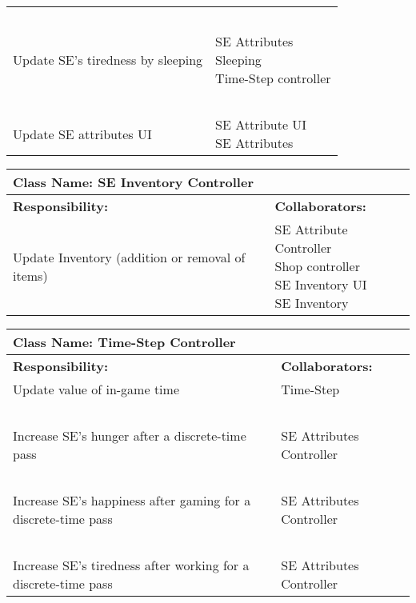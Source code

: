 \documentclass[]{article}
\begin{document}
\begin{table}[H]
\begin{tabular}{|p{5cm}|p{5cm}|}
        ~ & ~\\
        Update SE’s tiredness by sleeping & \makecell[l]{SE Attributes\\Sleeping\\Time-Step controller}\\
        ~ & ~\\
        Update SE attributes UI & \makecell[l]{SE Attribute UI\\SE Attributes}\\
        \hline
    \end{tabular}
\end{table}

\begin{table}[H]
    \centering
    \begin{tabular}{|p{5cm}|p{5cm}|}
        \hline
        \multicolumn{2}{|l|}{\textbf{Class Name:} SE Inventory Controller}\\
        \hline
        \textbf{Responsibility:} & \textbf{Collaborators:}\\
        \hline
        Update Inventory (addition or removal of items) & \makecell[l]{SE Attribute Controller\\Shop controller\\SE Inventory UI\\SE Inventory}\\
        \hline
    \end{tabular}
\end{table}

\begin{table}[H]
    \centering
    \begin{tabular}{|p{5cm}|p{5cm}|}
        \hline
        \multicolumn{2}{|l|}{\textbf{Class Name:} Time-Step Controller}\\
        \hline
        \textbf{Responsibility:} & \textbf{Collaborators:}\\
        \hline
        Update value of in-game time & Time-Step\\
        ~ & ~\\
        Increase SE’s hunger after a discrete-time pass & SE Attributes Controller\\
        ~ & ~\\
        Increase SE’s happiness after gaming for a discrete-time pass & SE Attributes Controller\\
        ~ & ~\\
        Increase SE’s tiredness after working for a discrete-time pass & SE Attributes Controller\\
        \hline
    \end{tabular}
\end{table}
\end{document}
